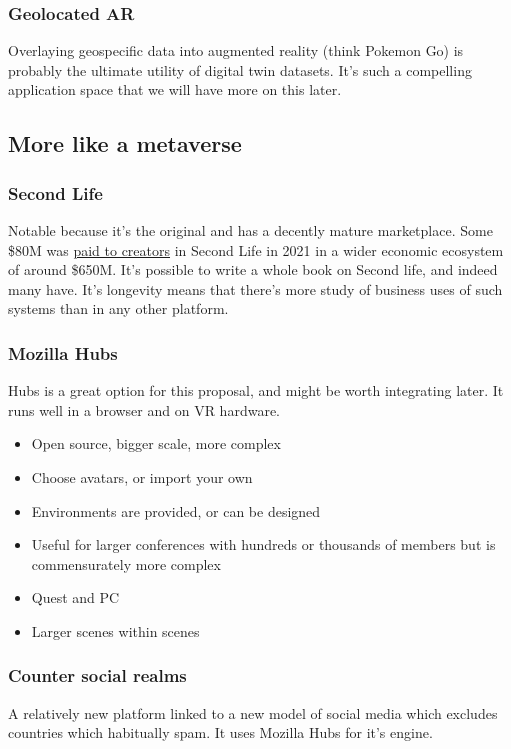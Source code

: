 \subsubsection{Geolocated AR}
Overlaying geospecific data into augmented reality (think Pokemon Go) is probably the ultimate utility of digital twin datasets. It's such a compelling application space that we will have more on this later.
\subsection{More like a metaverse}
\subsubsection{Second Life}
Notable because it's the original and has a decently mature marketplace. Some \$80M was \href{https://www.zdnet.com/article/high-fidelity-invests-in-second-life-to-expand-virtual-world/}{paid to creators} in Second Life in 2021 in a wider economic ecosystem of around \$650M. It's possible to write a whole book on Second life, and indeed many have. It's longevity means that there's more study of business uses of such systems than in any other platform. 
\subsubsection{Mozilla Hubs}
Hubs is a great option for this proposal, and might be worth integrating later. It runs well in a browser and on VR hardware.
\begin{itemize}
\item Open source, bigger scale, more complex
\item Choose avatars, or import your own
\item Environments are provided, or can be designed
\item Useful for larger conferences with hundreds or thousands of members but is commensurately more complex
\item Quest and PC
\item Larger scenes within scenes
\end{itemize}
\subsubsection{Counter social realms}
A relatively new platform linked to a new model of social media which excludes countries which habitually spam. It uses Mozilla Hubs for it's engine.
